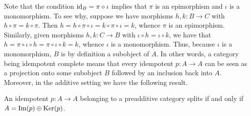 \noindent Note that the condition $\textnormal{id}_B = \pi \circ \iota$ implies that $\pi$ is an epimorphism and $\iota$ is a monomorphism. To see why, suppose we have morphisms $h, k : B \to C$ with $h \circ \pi = k \circ \pi$. Then $h = h \circ \pi \circ \iota = k \circ \pi \circ \iota = k$, whence $\pi$ is an epimorphism. Similarly, given morphisms $h, k : C \to B$ with $\iota \circ h = \iota \circ k$, we have that $h = \pi \circ \iota \circ h = \pi \circ \iota \circ k = k$, whence $\iota$ is a monomorphism. Thus, because $\iota$ is a monomorphism, $B$ is by definition a subobject of $A$. In other words, a category being idempotent complete means that every idempotent $p : A \to A$ can be seen as a projection onto some subobject $B$ followed by an inclusion back into $A$. Moreover, in the additive setting we have the following result.\\

\noindent\begin{proposition} An idempotent $p : A \to A$ belonging to a preadditive category splits if and only if $A = \textnormal{Im}(p) \oplus \textnormal{Ker}(p)$.\\
\end{proposition}

